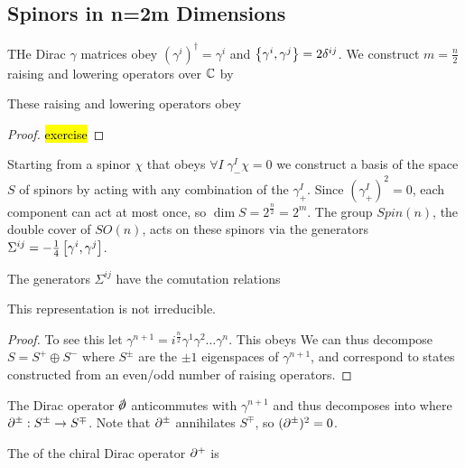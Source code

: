 \documentclass{article}
\begin{document}
\subsection{Spinors in n=2m Dimensions}
THe Dirac $\gamma$ matrices obey $(\gamma^i)^\dagger = \gamma^i$ and $\acomm[\gamma^i]{\gamma^j} = 2\delta^{ij}$. We construct $m= \frac{n}{2}$ raising and lowering operators over $\mbb{C}$ by 
\begin{lemma}
These raising and lowering operators obey 
\end{lemma}
\begin{proof}
	\hl{exercise}
\end{proof}
Starting from a spinor $\chi$ that obeys $\forall I \; \gamma_-^I \chi = 0$ we construct a basis of the space $S$ of spinors by acting with any combination of the $\gamma_+^I$. Since $(\gamma_+^I)^2 = 0$, each component can act at most once, so $\dim S = 2^{\frac{n}{2}} = 2^m$. The group $Spin(n)$, the double cover of $SO(n)$, acts on these spinors via the generators $\Sigma^{ij} = -\frac{1}{4} \comm[\gamma^i]{\gamma^j}$.
\begin{lemma}
The generators $\Sigma^{ij}$ have the comutation relations 
\eq{
\comm[\Sigma^{ij}]{\Sigma^{kl}} = i \left( \delta^{ik} \Sigma^{jl} + \delta^{jl}\Sigma^{ik} - \delta^{jk} \Sigma^{il} - \delta^{il} \Sigma^{jk} \right]
}
\end{lemma}
\begin{prop}
This representation is not irreducible.
\end{prop}
\begin{proof}
	 To see this let $\gamma^{n+1} = i^{\frac{n}{2}} \gamma^1 \gamma^2 \dots \gamma^n$. This obeys 
We can thus decompose $S = S^+ \oplus S^-$ where $S^\pm$ are the $\pm1$ eigenspaces of $\gamma^{n+1}$, and correspond to states constructed from an even/odd number of raising operators.
\end{proof}
The Dirac operator $\slashed{\del} $ anticommutes with $\gamma^{n+1}$ and thus decomposes into 
where $\del^\pm : S^\pm \to S^\mp$. Note that $\del^\pm$ annihilates $S^\mp$, so $(\del^\pm)^2 = 0$.
\begin{definition}
	The  of the chiral Dirac operator $\del^+$ is  
\eq{
\ind(\del^+) = \dim \ker (\del^+) - \dim \ker (\del^-)
}
\end{definition}
\end{document}
